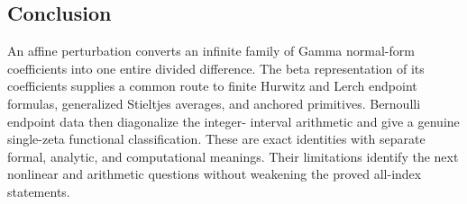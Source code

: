 \documentclass[11pt,letterpaper]{article}
\numberwithin{equation}{section}
\theoremstyle{definition}\newtheorem{definition}[theorem]{Definition}
\theoremstyle{remark}\newtheorem{remark}[theorem]{Remark}
\begin{document}
\subsection*{Conclusion}
An affine perturbation converts an infinite family of Gamma normal-form
coefficients into one entire divided difference. The beta representation
of its coefficients supplies a common route to finite Hurwitz and Lerch
endpoint formulas, generalized Stieltjes averages, and anchored
primitives. Bernoulli endpoint data then diagonalize the integer-
interval arithmetic and give a genuine single-zeta functional
classification. These are exact identities with separate formal,
analytic, and computational meanings. Their limitations identify the
next nonlinear and arithmetic questions without weakening the proved
all-index statements.

\end{document}
